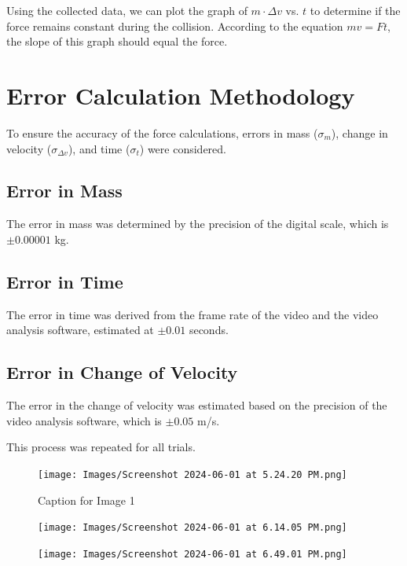 \documentclass[12pt]{article}
\begin{document}
Using the collected data, we can plot the graph of $m \cdot \Delta v$ vs. $t$ to determine if the force remains constant during the collision. According to the equation $mv = Ft$, the slope of this graph should equal the force.

\section{Error Calculation Methodology}

To ensure the accuracy of the force calculations, errors in mass ($\sigma_m$), change in velocity ($\sigma_{\Delta v}$), and time ($\sigma_t$) were considered.

\subsection*{Error in Mass}
The error in mass was determined by the precision of the digital scale, which is $\pm 0.00001$ kg.

\subsection*{Error in Time}
The error in time was derived from the frame rate of the video and the video analysis software, estimated at $\pm 0.01$ seconds.

\subsection*{Error in Change of Velocity}
The error in the change of velocity was estimated based on the precision of the video analysis software, which is $\pm 0.05$ m/s.

This process was repeated for all trials.

\begin{figure}[H]
    \centering
    \texttt{[image: Images/Screenshot 2024-06-01 at 5.24.20 PM.png]}
    \caption{Caption for Image 1}
    \label{fig:image1}
\end{figure}

\begin{figure}[H]
    \centering
    \texttt{[image: Images/Screenshot 2024-06-01 at 6.14.05 PM.png]}
    \label{fig:image2}
\end{figure}

\begin{figure}[H]
    \centering
    \texttt{[image: Images/Screenshot 2024-06-01 at 6.49.01 PM.png]}
    \label{fig:image3}
\end{figure}
\end{document}
